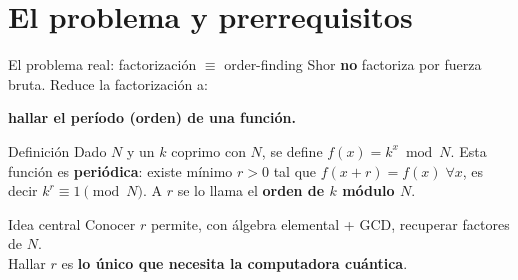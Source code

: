 \documentclass[aspectratio=169]{beamer}
\begin{document}
\section{El problema y prerrequisitos}

\begin{frame}{El problema real: factorización $\equiv$ order-finding}
  Shor \textbf{no} factoriza por fuerza bruta. Reduce la factorización a:\\[4pt]
  \begin{center}
    \textbf{hallar el período (orden) de una función.}
  \end{center}

  \begin{block}{Definición}
    \small
    Dado $N$ y un $k$ coprimo con $N$, se define $f(x) = k^x \bmod N$.
    Esta función es \textbf{periódica}: existe mínimo $r>0$ tal que
    $f(x+r)=f(x)\;\forall x$, es decir
    $k^r \equiv 1 \pmod{N}$.
    A $r$ se lo llama el \textbf{orden de $k$ módulo $N$}.
  \end{block}

  \begin{exampleblock}{Idea central}
    \small
    Conocer $r$ permite, con álgebra elemental + GCD, recuperar factores de $N$.\\
    Hallar $r$ es \textbf{lo único que necesita la computadora cuántica}.
  \end{exampleblock}

\end{frame}
\end{document}
